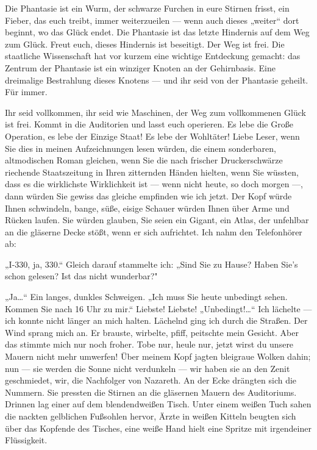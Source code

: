 Die Phantasie ist ein Wurm, der schwarze Furchen in eure Stirnen
frisst, ein Fieber, das euch treibt, immer weiterzueilen — wenn
auch dieses „weiter“ dort beginnt, wo das Glück endet. Die
Phantasie ist das letzte Hindernis auf dem Weg zum Glück. Freut
euch, dieses Hindernis ist beseitigt. Der Weg ist frei.
Die staatliche Wissenschaft hat vor kurzem eine wichtige Entdeckung
gemacht: das Zentrum der Phantasie ist ein winziger Knoten an der
Gehirnbasis. Eine dreimalige Bestrahlung dieses Knotens — und ihr
seid von der Phantasie geheilt. Für immer.

Ihr seid vollkommen, ihr seid wie Maschinen, der Weg zum
vollkommenen Glück ist frei. Kommt in die Auditorien und lasst euch
operieren. Es lebe die Große Operation, es lebe der Einzige Staat!
Es lebe der Wohltäter! Liebe Leser, wenn Sie dies in meinen
Aufzeichnungen lesen würden, die einem sonderbaren, altmodischen
Roman gleichen, wenn Sie die nach frischer Druckerschwärze
riechende Staatszeitung in Ihren zitternden Händen hielten, wenn
Sie wüssten, dass es die wirklichste Wirklichkeit ist — wenn nicht
heute, so doch morgen —, dann würden Sie gewiss das gleiche
empfinden wie ich jetzt. Der Kopf würde Ihnen schwindeln, bange,
süße, eisige Schauer würden Ihnen über Arme und Rücken laufen. Sie
würden glauben, Sie seien ein Gigant, ein Atlas, der unfehlbar an
die gläserne Decke stößt, wenn er sich aufrichtet. Ich nahm den
Telefonhörer ab:

„I-330, ja, 330.“ Gleich darauf stammelte ich: „Sind Sie zu Hause?
Haben Sie's schon gelesen? Ist das nicht wunderbar?"

„Ja\ldots{}“ Ein langes, dunkles Schweigen. „Ich muss Sie heute
unbedingt sehen. Kommen Sie nach 16 Uhr zu mir.“ Liebste! Liebste!
„Unbedingt!\ldots{}“ Ich lächelte — ich konnte nicht länger an mich
halten. Lächelnd ging ich durch die Straßen. Der Wind sprang mich
an. Er brauste, wirbelte, pfiff, peitschte mein Gesicht. Aber das
stimmte mich nur noch froher. Tobe nur, heule nur, jetzt wirst du
unsere Mauern nicht mehr umwerfen! Über meinem Kopf jagten
bleigraue Wolken dahin; nun — sie werden
die Sonne nicht verdunkeln — wir haben sie an den Zenit
geschmiedet, wir, die Nachfolger von Nazareth. An der Ecke drängten
sich die Nummern. Sie pressten die Stirnen an die gläsernen Mauern
des Auditoriums. Drinnen lag einer auf dem blendendweißen Tisch.
Unter einem weißen Tuch sahen die nackten gelblichen Fußsohlen
hervor, Ärzte in weißen Kitteln beugten sich über das Kopfende des
Tisches, eine weiße Hand hielt eine Spritze mit irgendeiner
Flüssigkeit.

